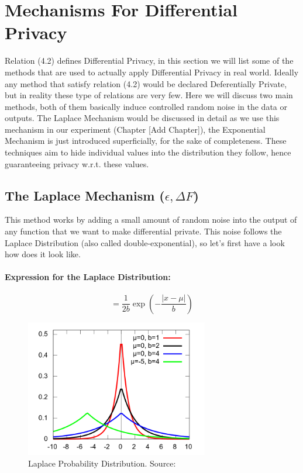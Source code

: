 \documentclass[12pt]{report}
\theoremstyle{named}
\begin{document}
\section{Mechanisms For Differential Privacy}
Relation (4.2) defines Differential Privacy, in this section we will list some of the methods that are used to actually apply Differential Privacy in real world. Ideally any method that satisfy relation (4.2) would be declared Deferentially Private, but in reality these type of relations are very few. Here we will discuss two main methods, both of them basically induce controlled random noise in the data or outputs. The Laplace Mechanism would be discussed in detail as we use this mechanism in our experiment (Chapter [Add Chapter]), the Exponential Mechanism is just introduced superficially, for the sake of completeness.  These techniques aim to hide individual values into the distribution they follow, hence guaranteeing privacy w.r.t. these values.

\subsection{The Laplace Mechanism ($\epsilon, \Delta F$)}
\label{sec:LaplaceMecha}
This method works by adding a small amount of random noise into the output of any function that we want to make differential private. This noise follows the Laplace Distribution (also called double-exponential), so let's first have a look how does it look like.

\paragraph{Expression for the Laplace Distribution:\\}
\begin{equation}
=\frac{1}{2b} \exp(-\frac{\left | x-\mu  \right |}{b})
\end{equation}
\begin{figure}[ht]
\centering
        \includegraphics[width=80mm,scale=1]{Images/LaplaceDistribution.png}
    \caption{Laplace Probability Distribution. Source:\cite{LaplaceDist}}
    \label{fig:laplace}
\end{figure}
\end{document}
